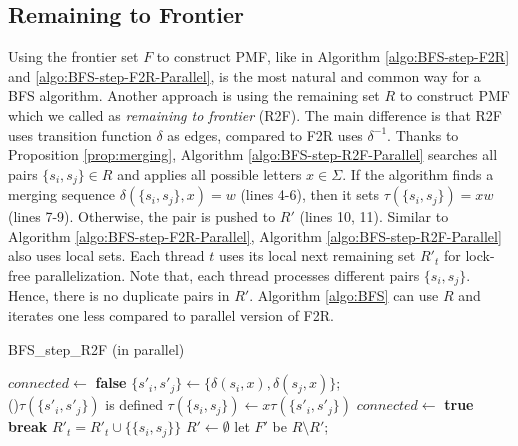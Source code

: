 \documentclass[12pt]{article}
\begin{document}
\subsection{Remaining to Frontier}
\label{sec:BFS-R2F-parallel}

Using the frontier set $F$ to construct PMF, like in Algorithm \ref{algo:BFS-step-F2R} and \ref{algo:BFS-step-F2R-Parallel}, is the most natural and common way for a BFS algorithm. Another approach is using the remaining set $R$ to construct PMF which we called as \textit{remaining to frontier} (R2F). The main difference is that R2F uses transition function $\delta$ as edges, compared to F2R uses $\delta^{-1}$. Thanks to Proposition \ref{prop:merging}, Algorithm \ref{algo:BFS-step-R2F-Parallel} searches all pairs $\{ s_i,s_j \}\in R$ and applies all possible letters $x \in \Sigma$. If the algorithm finds a merging sequence $\delta(\{ s_i,s_j \}, x) = w$ (lines 4-6), then it sets $\tau(\{ s_i,s_j \}) = xw$ (lines 7-9). Otherwise, the pair is pushed to $R'$ (lines 10, 11). Similar to Algorithm \ref{algo:BFS-step-F2R-Parallel}, Algorithm \ref{algo:BFS-step-R2F-Parallel} also uses local sets. Each thread $t$ uses its local next remaining set $R'_t$ for lock-free parallelization. Note that, each thread processes different pairs $\{ s_i,s_j \}$. Hence, there is no duplicate pairs in $R'$. Algorithm \ref{algo:BFS} can use $R$ and iterates one less compared to parallel version of F2R.

\begin{algorithm}[ht]
	\caption{BFS\_step\_R2F (in parallel)}
	\label{algo:BFS-step-R2F-Parallel}
	
	
		{
			$connected  \longleftarrow $ {\bf false}\;
			{
				$\{ s'_i, s'_j \}\longleftarrow \{ \delta(s_i,x),\delta(s_j,x) \}$; \\ 

				\If(){$\tau(\{ s'_i, s'_j \})$ is defined}
				{
					$\tau( \{ s_i, s_j\}) \longleftarrow x \tau(\{ s'_i, s'_j \})$\;
					$connected  \longleftarrow $ {\bf true}\;
					{\bf break}\;
				}
			}
			{
					$R'_t = R'_t \cup \{ \{ s_i, s_j \} \} $\;
			}
		}
		$R' \longleftarrow \emptyset$\;
	let $F'$ be $R \setminus R'$;
\end{algorithm}
\end{document}
